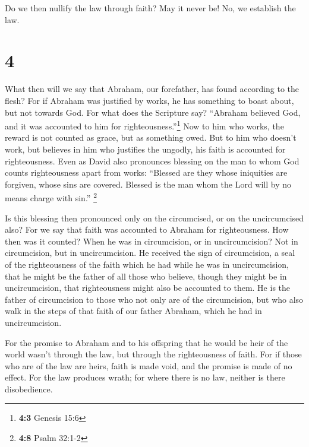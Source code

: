  Do we then nullify the law through faith? May it never
be! No, we establish the law.

\hypertarget{section-3}{%
\section{4}\label{section-3}}

 What then will we say that Abraham, our forefather, has
found according to the flesh?  For if Abraham was
justified by works, he has something to boast about, but not towards
God.  For what does the Scripture say? ``Abraham believed
God, and it was accounted to him for righteousness.''\footnote{\textbf{4:3}
  Genesis 15:6}  Now to him who works, the reward is not
counted as grace, but as something owed.  But to him who
doesn't work, but believes in him who justifies the ungodly, his faith
is accounted for righteousness.  Even as David also
pronounces blessing on the man to whom God counts righteousness apart
from works:  ``Blessed are they whose iniquities are
forgiven, whose sins are covered.  Blessed is the man whom
the Lord will by no means charge with sin.'' \footnote{\textbf{4:8}
  Psalm 32:1-2}

 Is this blessing then pronounced only on the circumcised,
or on the uncircumcised also? For we say that faith was accounted to
Abraham for righteousness.  How then was it counted? When
he was in circumcision, or in uncircumcision? Not in circumcision, but
in uncircumcision.  He received the sign of circumcision,
a seal of the righteousness of the faith which he had while he was in
uncircumcision, that he might be the father of all those who believe,
though they might be in uncircumcision, that righteousness might also be
accounted to them.  He is the father of circumcision to
those who not only are of the circumcision, but who also walk in the
steps of that faith of our father Abraham, which he had in
uncircumcision.

 For the promise to Abraham and to his offspring that he
would be heir of the world wasn't through the law, but through the
righteousness of faith.  For if those who are of the law
are heirs, faith is made void, and the promise is made of no effect.
 For the law produces wrath; for where there is no law,
neither is there disobedience.

